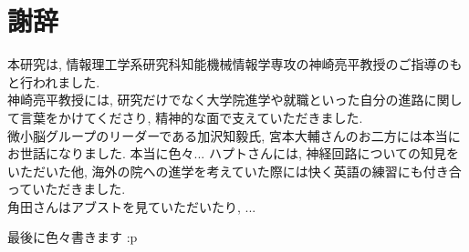 \section{謝辞}
本研究は, 情報理工学系研究科知能機械情報学専攻の神崎亮平教授のご指導のもと行われました.\\
神崎亮平教授には, 研究だけでなく大学院進学や就職といった自分の進路に関して言葉をかけてくださり, 精神的な面で支えていただきました.\\
微小脳グループのリーダーである加沢知毅氏, 宮本大輔さんのお二方には本当にお世話になりました.
本当に色々...
ハプトさんには, 神経回路についての知見をいただいた他, 海外の院への進学を考えていた際には快く英語の練習にも付き合っていただきました.\\
角田さんはアブストを見ていただいたり,
...

最後に色々書きます :p
